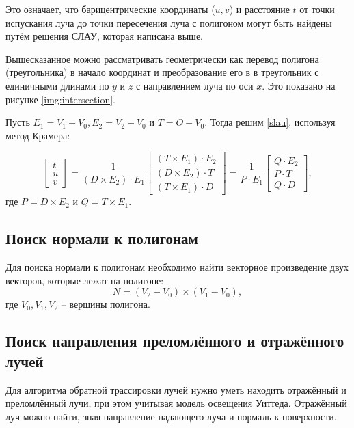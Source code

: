Это означает, что барицентрические координаты ($u,v$) и расстояние $t$ от точки испускания луча до точки пересечения луча с полигоном могут быть найдены путём решения СЛАУ, которая написана выше.

Вышесказанное можно рассматривать геометрически как перевод полигона (треугольника) в начало координат и преобразование его в в треугольник с единичными длинами по $y$ и $z$ с направлением луча по оси $x$. Это показано на рисунке
\ref{img:intersection}.



Пусть $E_1=V_1-V_0, E_2=V_2-V_0$ и $T=O - V_0$. Тогда решим \ref{slau}, используя метод Крамера:

\begin{equation}
\label{solution}
\begin{bmatrix}
t\\
u\\
v
\end{bmatrix} = \frac{1}{(D\times E_2) \cdot E_1}
\begin{bmatrix}
(T\times E_1) \cdot E_2\\
(D\times E_2) \cdot T\\
(T\times E_1) \cdot D
\end{bmatrix} = \frac{1}{P \cdot E_1}
\begin{bmatrix}
Q \cdot E_2\\
P \cdot T\\
Q \cdot D
\end{bmatrix},
\end{equation}
где $P = D \times E_2$ и $Q = T \times E_1$.

\subsection{Поиск нормали к полигонам}

Для поиска нормали к полигонам необходимо найти векторное произведение двух векторов, которые лежат на полигоне:
\begin{equation}
N = (V_2 - V_0) \times (V_1 - V_0),
\end{equation}
где $V_0, V_1, V_2$ -- вершины полигона.

\subsection{Поиск направления преломлённого и отражённого лучей}

Для алгоритма обратной трассировки лучей нужно уметь находить отражённый и преломлённый лучи, при этом учитывая модель освещения Уиттеда.
Отражённый луч можно найти, зная направление падающего луча и нормаль к поверхности. 

